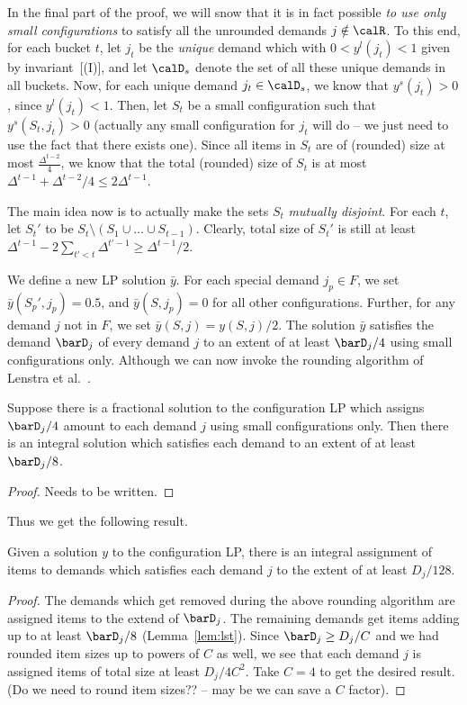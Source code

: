 
\medskip {}
In the final part of the proof, we will snow that it is in fact possible \emph{to use only small configurations} to satisfy all the unrounded demands $j \notin \calR$.
To this end, for each bucket $t$, let $j_t$ be the {\em unique} demand which with $0 < y^l(j_t) < 1$ given by invariant~[(I)], and let $\calD_s$ denote the set of all these unique demands in all buckets. Now, for each unique demand $j_t \in \calD_s$, we know that $y^s(j_t) > 0$, since $y^l(j_t) < 1$. Then, let $S_t$ be a small configuration such that $y^s(S_t,j_t) > 0$ (actually any small configuration for $j_t$ will do -- we just need to use the fact that there exists one). Since all items in $S_t$ are of (rounded) size at most $\frac{\Delta^{t-2}}{4}$, we know that the total (rounded) size of $S_t$ is at most $\Delta^{t-1} + \Delta^{t-2}/4 \leq 2 \Delta^{t-1}$.

The main idea now is to actually make the sets $S_t$ \emph{mutually disjoint}. For each $t$, let $S_t'$ to be $S_t \setminus (S_1 \cup \ldots \cup S_{t-1})$. Clearly, total size of $S_t'$ is still at least $\Delta^{t-1} - 2\sum_{t' < t} \Delta^{t'-1} \geq \Delta^{t-1}/2$.


We define a new LP solution ${\bar y}$.
For each special demand $j_p \in F$,
we set ${\bar y}(S_p',j_p) = 0.5$, and ${\bar y}(S,j_p) = 0$ for all other configurations. Further, for any demand $j$ not in $F$, we set ${\bar y}(S,j) =  y(S,j)/2$. The solution ${\bar y}$ satisfies the demand $\barD_j$ of every demand $j$ to an extent of at least $\barD_j/4$ using small configurations only.  Although we can now invoke the rounding algorithm of Lenstra et al.~\cite{}.

\begin{lemma}
\label{lem:lst}
Suppose there is a fractional solution to the configuration LP which assigns $\barD_j/4$ amount to each demand $j$ using small configurations only.
Then there is an integral solution which satisfies each demand to an extent of at least $\barD_j/8$.
\end{lemma}
\begin{proof}
Needs to be written.
\end{proof}

Thus we get the following result.
\begin{theorem}
\label{thm:config}
Given a solution $y$ to the configuration LP, there is an integral assignment of items to demands which satisfies each demand $j$ to the extent of at least
$D_j/128$.
\end{theorem}
\begin{proof}
The demands which get removed during the above rounding algorithm are assigned items to the extend of $\barD_j$. The remaining demands
get items adding up to at least $\barD_j/8$ (Lemma~\ref{lem:lst}). Since $\barD_j \geq D_j/C$ and we had rounded item sizes up to powers of $C$ as
well, we see that each demand $j$ is assigned items of total size at least $D_j/4C^2$. Take $C=4$ to get the desired result.
(Do we need to round item sizes?? -- may be we can save a $C$ factor).
\end{proof}
